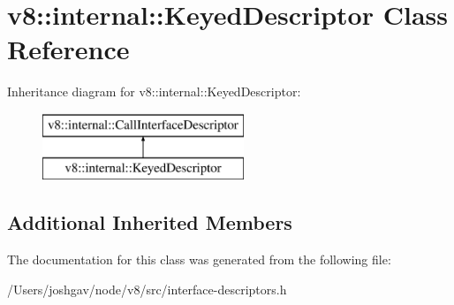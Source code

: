 \hypertarget{classv8_1_1internal_1_1_keyed_descriptor}{}\section{v8\+:\+:internal\+:\+:Keyed\+Descriptor Class Reference}
\label{classv8_1_1internal_1_1_keyed_descriptor}
Inheritance diagram for v8\+:\+:internal\+:\+:Keyed\+Descriptor\+:\begin{figure}[H]
\begin{center}
\leavevmode
\includegraphics[height=2.000000cm]{classv8_1_1internal_1_1_keyed_descriptor}
\end{center}
\end{figure}
\subsection*{Additional Inherited Members}


The documentation for this class was generated from the following file\+:\begin{DoxyCompactItemize}
\item 
/\+Users/joshgav/node/v8/src/interface-\/descriptors.\+h\end{DoxyCompactItemize}
